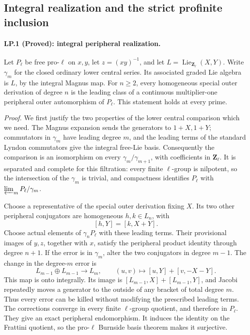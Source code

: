 
\subsection{Integral realization and the strict profinite inclusion}

\paragraph{LP.1 (Proved): integral peripheral realization.}
Let $P_\ell$ be free pro-$\ell$ on $x,y$, let
$z=(xy)^{-1}$, and let $L=\operatorname{Lie}_{\mathbf Z_\ell}(X,Y)$.
Write $\gamma_m$ for the closed ordinary lower central series. Its
associated graded Lie algebra is $L$, by the integral Magnus map.
For $n\geq2$, every homogeneous special outer derivation of degree $n$
is the leading class of a continuous multiplier-one peripheral outer
automorphism of $P_\ell$. This statement holds at every prime.

\emph{Proof.}
We first justify the two properties of the lower central comparison which
we need. The Magnus expansion sends the generators to $1+X,1+Y$;
commutators in $\gamma_m$ have leading degree $m$, and the leading
terms of the standard Lyndon commutators give the integral free-Lie
basis. Consequently the comparison is an isomorphism on every
$\gamma_m/\gamma_{m+1}$, with coefficients in $\mathbf Z_\ell$.
It is separated and complete for this filtration: every finite
$\ell$-group is nilpotent, so the intersection of the $\gamma_m$ is
trivial, and compactness identifies $P_\ell$ with
$\varprojlim_m P_\ell/\gamma_m$.

Choose a representative of the special outer derivation fixing $X$.
Its two other peripheral conjugators are homogeneous $h,k\in L_n$,
with
\[
             [h,Y]=[k,X+Y].
\]
Choose actual elements of $\gamma_nP_\ell$ with these leading terms.
Their provisional images of $y,z$, together with $x$, satisfy the
peripheral product identity through degree $n+1$. If the error is in
$\gamma_m$, alter the two conjugators in degree $m-1$. The change
in the degree-$m$ error is
\[
 L_{m-1}\oplus L_{m-1}\longrightarrow L_m,
 \qquad (u,v)\longmapsto[u,Y]+[v,-X-Y].
\]
This map is onto integrally. Its image is
$[L_{m-1},X]+[L_{m-1},Y]$, and Jacobi repeatedly moves a generator
to the outside of any bracket of total degree $m$. Thus every error
can be killed without modifying the prescribed leading terms.
The corrections converge in every finite $\ell$-group quotient,
and therefore in $P_\ell$. They give an exact peripheral endomorphism.
It induces the identity on the Frattini quotient, so the pro-$\ell$
Burnside basis theorem makes it surjective.

